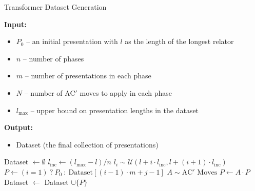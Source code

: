 \begin{algorithm}
	\caption{Transformer Dataset Generation}
	\label{alg:apply_ac_moves}
	\begin{algorithmic}[1]
		\State \textbf{Input:}
		\begin{itemize}
			\item[] $P_0$ -- an initial presentation with $l$ as the length of the longest relator
			\item[] $n$ -- number of phases
			\item[] $m$ -- number of presentations in each phase
			\item[] $N$ -- number of AC$'$ moves to apply in each phase
			\item[] $l_{\text{max}}$ -- upper bound on presentation lengths in the dataset
		\end{itemize}
		\State\textbf{Output:}
		\begin{itemize}
			\item[] Dataset (the final collection of presentations)
		\end{itemize}
		\State Dataset $\gets \emptyset$ 
		\State $l_{\text{inc}} \gets (l_{\text{max}} - l) / n$ 
		 
			 
			\State $l_i \sim \mathcal{U}(l + i \cdot l_{\text{inc}}, l + (i+1) \cdot l_{\text{inc}})$
			\State $P \gets (i = 1) \ ? \ P_0 \ : \ \text{Dataset}[(i-1) \cdot m + j - 1]$
			 
				\State $A \sim \text{AC}' \text{ Moves}$
				\State $P \gets A \cdot P$
			\EndFor
			\State Dataset $\gets$ Dataset $\cup \{P\}$
			\EndFor
		\EndFor
	\end{algorithmic}
\end{algorithm}